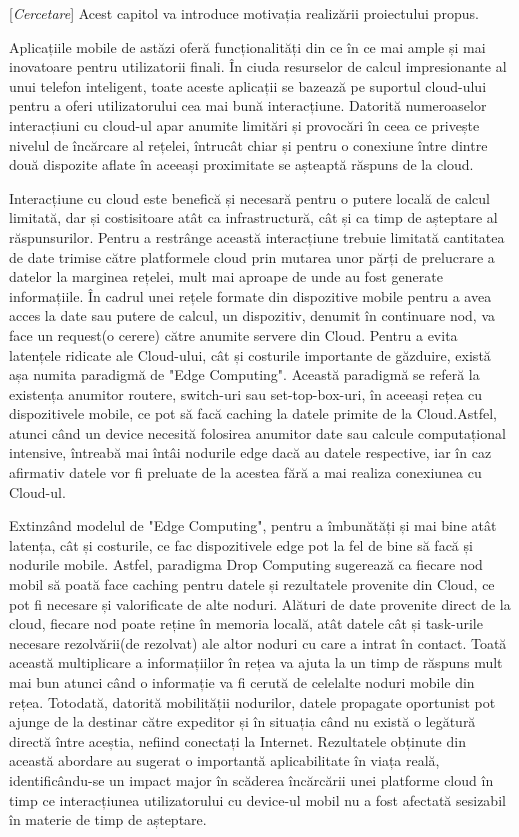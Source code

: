 \documentclass[12pt,a4paper]{report}
\newcommand{\worktype}[1]{[\textit{#1}] }
\newcommand{\cercetare}{\worktype{Cercetare}}
\begin{document}
\cercetare Acest capitol va introduce motivația realizării proiectului propus.

Aplicațiile mobile de astăzi oferă funcționalități din ce în ce mai ample și mai inovatoare pentru utilizatorii finali. În ciuda resurselor de calcul impresionante al unui telefon inteligent, toate aceste aplicații se bazează pe suportul cloud-ului pentru a oferi utilizatorului cea mai bună interacțiune. Datorită numeroaselor interacțiuni cu cloud-ul apar anumite limitări și provocări în ceea ce privește nivelul de încărcare al rețelei, întrucât chiar și pentru o conexiune între dintre două dispozite aflate în aceeași proximitate se așteaptă răspuns de la cloud.

Interacțiune cu cloud este benefică și necesară pentru o putere locală de calcul limitată, dar și costisitoare atât ca infrastructură, cât și ca timp de așteptare al răspunsurilor. Pentru a restrânge această interacțiune trebuie limitată cantitatea de date trimise către platformele cloud prin mutarea unor părți de prelucrare a datelor la marginea rețelei, mult mai aproape de unde au fost generate informațiile. În cadrul unei rețele formate din dispozitive mobile pentru a avea acces la date sau putere de calcul, un dispozitiv, denumit în continuare nod, va face un request(o cerere) către anumite servere din Cloud. Pentru a evita latențele ridicate ale Cloud-ului, cât și costurile importante de găzduire, există așa numita paradigmă de "Edge Computing". Această paradigmă se referă la existența anumitor routere, switch-uri sau set-top-box-uri, în aceeași rețea cu dispozitivele mobile, ce pot să facă caching la datele primite de la Cloud.Astfel, atunci când un device necesită folosirea anumitor date sau calcule computațional intensive, întreabă mai întâi nodurile edge dacă au datele respective, iar în caz afirmativ datele vor fi preluate de la acestea fără a mai realiza conexiunea cu Cloud-ul.

Extinzând modelul de "Edge Computing", pentru a îmbunătăți și mai bine atât latența, cât și costurile, ce fac dispozitivele edge pot la fel de bine să facă și nodurile mobile. Astfel, paradigma Drop Computing sugerează ca fiecare nod mobil să poată face caching pentru datele și rezultatele provenite din Cloud, ce pot fi necesare și valorificate de alte noduri. Alături de date provenite direct de la cloud, fiecare nod poate reține în memoria locală, atât datele cât și task-urile necesare rezolvării(de rezolvat) ale altor noduri cu care a intrat în contact. Toată această multiplicare a informațiilor în rețea va ajuta la un timp de răspuns mult mai bun atunci când o informație va fi cerută de celelalte noduri mobile din rețea. Totodată, datorită mobilității nodurilor, datele propagate oportunist pot ajunge de la destinar către expeditor și în situația când nu există o legătură directă între aceștia, nefiind conectați la Internet. Rezultatele obținute din această abordare au sugerat o importantă aplicabilitate în viața reală, identificându-se un impact major în scăderea încărcării unei platforme cloud în timp ce interacțiunea utilizatorului cu device-ul mobil nu a fost afectată sesizabil în materie de timp de așteptare.
\end{document}
